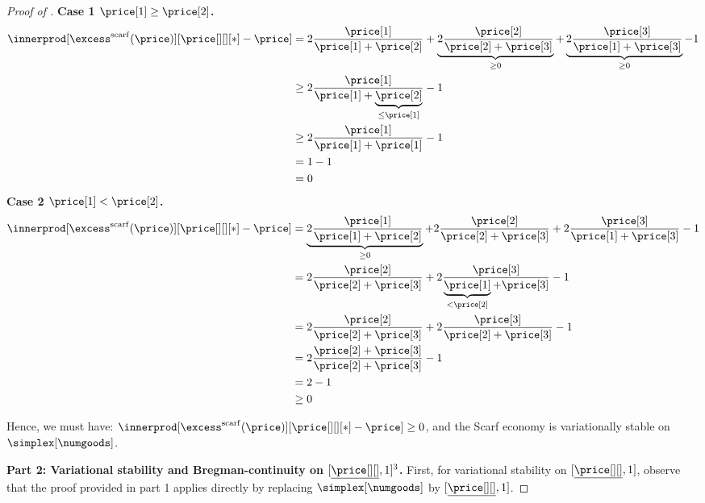 \begin{proof}[Proof of ]
    \textbf{Case 1 $\price[1] \geq \price[2]$.}
    \begin{align*}
        \innerprod[{ \excess^{\mathrm{scarf}}(\price)}][{\price[][][*] - \price}] &= 2\frac{\price[1]}{\price[1] + \price[2]} + \underbrace{2\frac{\price[2] }{\price[2] + \price[3]}}_{\geq 0} + \underbrace{2 \frac{\price[3]}{\price[1] + \price[3]}}_{\geq 0} - 1\\
        &\geq  2\frac{\price[1]}{\price[1] + \underbrace{\price[2]}_{\leq \price[1]}} - 1\\
        &\geq  2\frac{\price[1]}{\price[1] + \price[1]}  - 1\\
        &=  1 - 1\\
        &= 0
    \end{align*}
    \textbf{Case 2 $\price[1] < \price[2]$.}
    \begin{align*}
        \innerprod[{ \excess^{\mathrm{scarf}}(\price)}][{\price[][][*] - \price}]
        &= \underbrace{2\frac{\price[1]}{\price[1] + \price[2]}}_{\geq 0} + 2\frac{\price[2] }{\price[2] + \price[3]} + 2 \frac{\price[3]}{\price[1] + \price[3]} - 1\\
        &= 2\frac{\price[2] }{\price[2] + \price[3]} + 2 \frac{\price[3]}{\underbrace{\price[1]}_{< \price[2]} + \price[3]} - 1\\
        &= 2\frac{\price[2] }{\price[2] + \price[3]} + 2 \frac{\price[3]}{\price[2] + \price[3]} - 1\\
        &= 2\frac{\price[2] + \price[3]}{\price[2] + \price[3]} - 1\\
        &= 2-1\\
        &\geq 0
    \end{align*}

    Hence, we must have: $\innerprod[{ \excess^{\mathrm{scarf}}(\price)}][{\price[][][*] - \price}] \geq 0$, and the Scarf economy is variationally stable on $\simplex[\numgoods]$. 

    \textbf{Part 2: Variational stability and Bregman-continuity on $[\underline{\price[ ][]}, 1]^3$.}
    First, for variational stability on $[\underline{\price[ ][]}, 1]$, observe that the proof provided in part 1 applies directly by replacing $\simplex[\numgoods]$ by $[\underline{\price[ ][]}, 1]$. 
    

\end{proof}
